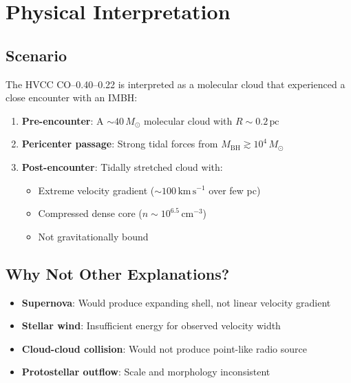 \documentclass[11pt,a4paper]{article}
\newcommand{\Msun}{M_\odot}
\newcommand{\kms}{\,\mathrm{km\,s^{-1}}}
\newcommand{\pc}{\,\mathrm{pc}}
\newcommand{\cmcubed}{\,\mathrm{cm^{-3}}}
\begin{document}
\section{Physical Interpretation}

\subsection{Scenario}

The HVCC CO--0.40--0.22 is interpreted as a molecular cloud that experienced a close encounter with an IMBH:

\begin{enumerate}
    \item \textbf{Pre-encounter}: A $\sim 40\,\Msun$ molecular cloud with $R \sim 0.2\pc$
    \item \textbf{Pericenter passage}: Strong tidal forces from $M_\mathrm{BH} \gtrsim 10^4\,\Msun$
    \item \textbf{Post-encounter}: Tidally stretched cloud with:
    \begin{itemize}
        \item Extreme velocity gradient ($\sim 100\kms$ over few pc)
        \item Compressed dense core ($n \sim 10^{6.5}\cmcubed$)
        \item Not gravitationally bound
    \end{itemize}
\end{enumerate}

\subsection{Why Not Other Explanations?}

\begin{itemize}
    \item \textbf{Supernova}: Would produce expanding shell, not linear velocity gradient
    \item \textbf{Stellar wind}: Insufficient energy for observed velocity width
    \item \textbf{Cloud-cloud collision}: Would not produce point-like radio source
    \item \textbf{Protostellar outflow}: Scale and morphology inconsistent
\end{itemize}

\end{document}
